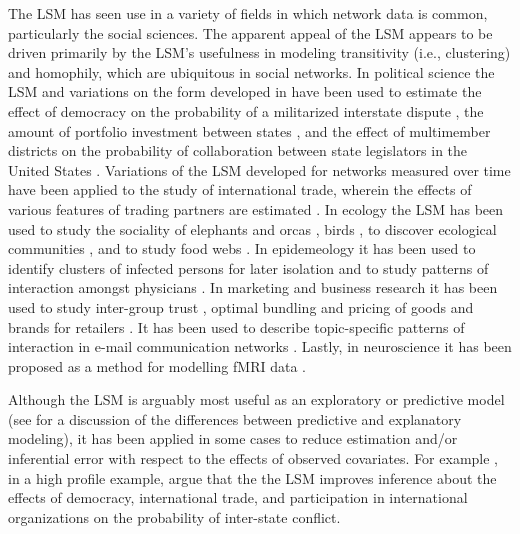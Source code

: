 \documentclass[11pt]{article}
\begin{document}
The LSM has seen use in a variety of fields in which network data is common, particularly the social sciences. The apparent appeal of the LSM appears to be driven primarily by the LSM's usefulness in modeling transitivity (i.e., clustering) and homophily, which are ubiquitous in social networks. In political science the LSM and variations on the form developed in \cite{hoff2002latent} have been used to estimate the effect of democracy on the probability of a militarized interstate dispute \citep{ward2007disputes}, the amount of portfolio investment between states \citep{cao2013democracies}, and the effect of multimember districts on the probability of collaboration between state legislators in the United States \citep{kirkland2012multimember}. Variations of the LSM developed for networks measured over time have been applied to the study of international trade, wherein the effects of various features of trading partners are estimated \citep{ward2013gravity}. In ecology the LSM has been used to study the sociality of elephants \citep{vance2009social} and orcas \citep{fearnbach2014spatial}, birds \citep{nomano2015unrelated}, to discover ecological communities \citep{fletcher2011social, fletcher2013network}, and to study food webs \citep{chiu2011unifying}. In epidemeology it has been used to identify clusters of infected persons for later isolation \citep{zhang2015cluster} and to study patterns of interaction amongst physicians \citep{paul2014results}. In marketing and business research it has been used to study inter-group trust \citep{dass2011impact}, optimal bundling and pricing of goods and brands for retailers \citep{dass2012assessing}. It has been used to describe topic-specific patterns of interaction in e-mail communication networks \citep{krafft2012topic}.  Lastly, in neuroscience it has been proposed as a method for modelling fMRI data \citep{simpson2013analyzing}.


Although the LSM is arguably most useful as an exploratory or predictive model (see \citet{shmueli2010explain} for a discussion of the differences between predictive and explanatory modeling), it has been applied in some cases to reduce estimation and/or inferential error with respect to the effects of observed covariates. For example \citet{ward2007disputes}, in a high profile example, argue that the the LSM improves inference about the effects of democracy, international trade, and participation in international organizations on the probability of inter-state conflict.
\end{document}
